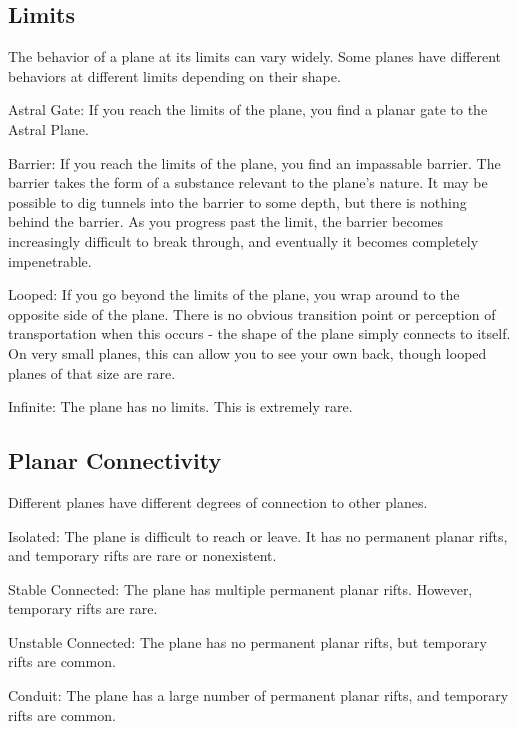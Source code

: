  \subsection{Limits} The behavior of a plane at its limits can vary widely.
    Some planes have different behaviors at different limits depending on their shape.
    \begin{raggeditemize}
      \item Astral Gate: If you reach the limits of the plane, you find a planar gate to the Astral Plane.
      \item Barrier: If you reach the limits of the plane, you find an impassable barrier.
        The barrier takes the form of a substance relevant to the plane's nature.
        It may be possible to dig tunnels into the barrier to some depth, but there is nothing behind the barrier.
        As you progress past the limit, the barrier becomes increasingly difficult to break through, and eventually it becomes completely impenetrable.
      \item Looped: If you go beyond the limits of the plane, you wrap around to the opposite side of the plane.
        There is no obvious transition point or perception of transportation when this occurs - the shape of the plane simply connects to itself.
        On very small planes, this can allow you to see your own back, though looped planes of that size are rare.
      \item Infinite: The plane has no limits. This is extremely rare.
    \end{raggeditemize}

  \subsection{Planar Connectivity}
    Different planes have different degrees of connection to other planes.
    \begin{raggeditemize}
      \item Isolated: The plane is difficult to reach or leave.
        It has no permanent planar rifts, and temporary rifts are rare or nonexistent.
      \item Stable Connected: The plane has multiple permanent planar rifts.
        However, temporary rifts are rare.
      \item Unstable Connected: The plane has no permanent planar rifts, but temporary rifts are common.
      \item Conduit: The plane has a large number of permanent planar rifts, and temporary rifts are common.
    \end{raggeditemize}

